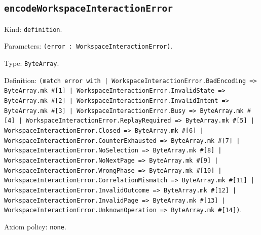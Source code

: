 \documentclass[11pt]{article}
\begin{document}
\subsection*{\texttt{encodeWorkspaceInteractionError}}
\noindent Kind: \texttt{definition}.\par
\noindent Parameters: \texttt{(error : WorkspaceInteractionError)}.\par
\noindent Type: \texttt{ByteArray}.\par
\noindent Definition: \texttt{(match error with | WorkspaceInteractionError.BadEncoding => ByteArray.mk \#[1] | WorkspaceInteractionError.InvalidState => ByteArray.mk \#[2] | WorkspaceInteractionError.InvalidIntent => ByteArray.mk \#[3] | WorkspaceInteractionError.Busy => ByteArray.mk \#[4] | WorkspaceInteractionError.ReplayRequired => ByteArray.mk \#[5] | WorkspaceInteractionError.Closed => ByteArray.mk \#[6] | WorkspaceInteractionError.CounterExhausted => ByteArray.mk \#[7] | WorkspaceInteractionError.NoSelection => ByteArray.mk \#[8] | WorkspaceInteractionError.NoNextPage => ByteArray.mk \#[9] | WorkspaceInteractionError.WrongPhase => ByteArray.mk \#[10] | WorkspaceInteractionError.CorrelationMismatch => ByteArray.mk \#[11] | WorkspaceInteractionError.InvalidOutcome => ByteArray.mk \#[12] | WorkspaceInteractionError.InvalidPage => ByteArray.mk \#[13] | WorkspaceInteractionError.UnknownOperation => ByteArray.mk \#[14])}.\par
\noindent Axiom policy: \texttt{none}.\par
\end{document}
